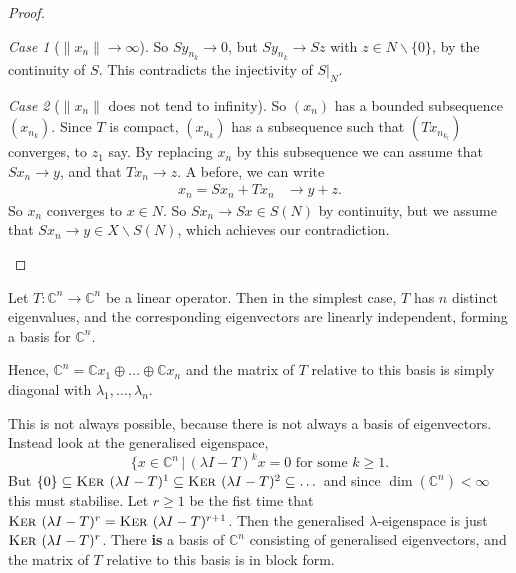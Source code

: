 \documentclass[justified]{tufte-book}
\theoremstyle{plain}%
\theoremstyle{definition}
\theoremstyle{remark}
\newtheorem{case}{Case}
\newcommand{\given}{ \, | \,}
\renewcommand{\C}{\mathbb{C}}
\renewcommand{\ker}{\textsc{Ker\ }}
\begin{document}
\begin{proof}
\begin{enumerate}[(a)]
\begin{case}[$\| x_n \| \rightarrow \infty$]
          So $S y_{n_k} \rightarrow 0$, but $S y_{n_k} \rightarrow Sz$ with $z \in N \backslash \{ 0 \}$, by the continuity of $S$.  This contradicts the injectivity of $S|_N$.  
      \end{case}   
      \begin{case}[$ \| x_n \|$ does not tend to infinity]
          So $(x_n)$ has a bounded subsequence $(x_{n_k})$.  Since $T$ is compact, $(x_{n_k})$ has a subsequence such that $(T x_{n_{k_l}})$ converges, to $z_1$ say.  By replacing $x_n$ by this subsequence we can assume that $Sx_n \rightarrow y$, and that $Tx_n \rightarrow z$.  A before, we can write \begin{align*}
          x_n = S x_n + T x_n &\rightarrow y + z.
          \end{align*}  So $x_n$ converges to $x \in N$.  So $S x_n \rightarrow Sx \in S(N)$ by continuity, but we assume that $S x_n \rightarrow y \in X \backslash S(N)$, which achieves our contradiction.
      \end{case}
  \end{enumerate}  
\end{proof}

Let $T: \C^n \rightarrow \C^n$ be a linear operator.  Then in the simplest case, $T$ has $n$ distinct eigenvalues, and the corresponding eigenvectors are linearly independent, forming a basis for $\C^n$.  

Hence, $\C^n = \C x_1 \oplus \dots \oplus \C x_n$ and the matrix of $T$ relative to this basis is simply diagonal with $\lambda_1, \dots, \lambda_n$.  

This is not always possible, because there is not always a basis of eigenvectors.  Instead look at the generalised eigenspace, \[
  \{ x \in \C^n \given \text{$(\lambda I - T)^k x = 0$ for some $k \geq 1$}.  
\] 
But $\{ 0 \} \subseteq \ker(\lambda I - T)^1 \subseteq \ker(\lambda I - T)^2 \subseteq \dots$
 and since $\dim(\C^n) < \infty$ this must stabilise.  Let $r \geq 1$ be the fist time that $\ker (\lambda I - T)^r = \ker( \lambda I - T)^{r+1}$.  Then the generalised $\lambda$-eigenspace is just $\ker(\lambda I - T)^r$.  There \textbf{is} a basis of $\C^n$ consisting of generalised eigenvectors, and the matrix of $T$ relative to this basis is in block form.  
\end{document}
